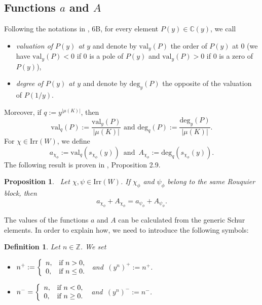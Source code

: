 \documentclass[10pt,a4paper,titlepage]{article}
\newtheorem{definition}[theorem]{Definition}
\newtheorem{proposition}[theorem]{Proposition}
\begin{document}
 \subsection{Functions $a$ and $A$}

Following the notations in \cite{BMM2}, 6B, for every element $P(y)
\in \mathbb{C}(y)$, we call
\begin{itemize}
  \item \emph{valuation of $P(y)$ at $y$} and denote by $\mathrm{val}_y(P)$ the order of $P(y)$
  at 0 (we have $\mathrm{val}_y(P)<0$ if 0 is a pole of $P(y)$ and $\mathrm{val}_y(P)>0$ if 0 is a zero of $P(y)$),
  \item \emph{degree of $P(y)$ at $y$} and denote by $\mathrm{deg}_y(P)$ the opposite of the
  valuation of $P(1/y)$.
\end{itemize}
Moreover, if $q:=y^{|\mu(K)|}$, then
$$\mathrm{val}_q(P):=\frac{\mathrm{val}_y(P)}{|\mu(K)|} \textrm{ and }
\mathrm{deg}_q(P):=\frac{\mathrm{deg}_y(P)}{|\mu(K)|}.$$ 
For $\chi
\in \mathrm{Irr}(W)$, we define
$$a_{\chi_\phi}:=\mathrm{val}_q(s_{\chi_\phi}(y)) \,\textrm{ and }\,
A_{\chi_\phi}:=\mathrm{deg}_q(s_{\chi_\phi}(y)).$$ 
The following
result is proven in \cite{BK}, Proposition 2.9.

\begin{proposition}\label{aA}\
Let $\chi,\psi \in \mathrm{Irr}(W)$. If $\chi_\phi$ and
        $\psi_\phi$ belong to the same Rouquier block, then
        $$a_{\chi_\phi}+A_{\chi_\phi}=a_{\psi_\phi}+A_{\psi_\phi}.$$
\end{proposition}

The values of the functions $a$ and $A$ can be calculated from the generic Schur elements. In order to explain how, we need to introduce the following symbols:
  
\begin{definition}\label{symbols} Let  $n \in \mathbb{Z}$. We set
\begin{itemize}
  \item $n^+ := \left\{
                      \begin{array}{ll}
                        n, & \hbox{if $n > 0$,} \\
                        0, & \hbox{if $n \leq 0$.}
                      \end{array}
                    \right.$ and\,  
  $(y^n)^+ := n^+$.
   \item $n^- = \left\{
                      \begin{array}{ll}
                        n, & \hbox{if $n < 0$,} \\
                        0, & \hbox{if $n \geq 0$.}
                      \end{array}
                    \right.$ \,and\,  
  $(y^n)^- := n^-$.
\end{itemize}
\end{definition}
\end{document}
